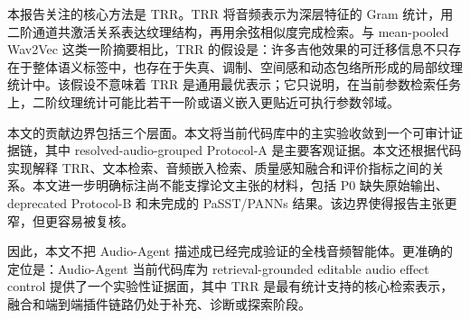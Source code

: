 本报告关注的核心方法是 TRR。TRR 将音频表示为深层特征的 Gram 统计，用二阶通道共激活关系表达纹理结构，再用余弦相似度完成检索。与 mean-pooled Wav2Vec 这类一阶摘要相比，TRR 的假设是：许多吉他效果的可迁移信息不只存在于整体语义标签中，也存在于失真、调制、空间感和动态包络所形成的局部纹理统计中。该假设不意味着 TRR 是通用最优表示；它只说明，在当前参数检索任务上，二阶纹理统计可能比若干一阶或语义嵌入更贴近可执行参数邻域。

本文的贡献边界包括三个层面。本文将当前代码库中的主实验收敛到一个可审计证据链，其中 resolved-audio-grouped Protocol-A 是主要客观证据。本文还根据代码实现解释 TRR、文本检索、音频嵌入检索、质量感知融合和评价指标之间的关系。本文进一步明确标注尚不能支撑论文主张的材料，包括 P0 缺失原始输出、deprecated Protocol-B 和未完成的 PaSST/PANNs 结果。该边界使得报告主张更窄，但更容易被复核。

因此，本文不把 Audio-Agent 描述成已经完成验证的全栈音频智能体。更准确的定位是：Audio-Agent 当前代码库为 retrieval-grounded editable audio effect control 提供了一个实验性证据面，其中 TRR 是最有统计支持的核心检索表示，融合和端到端插件链路仍处于补充、诊断或探索阶段。

